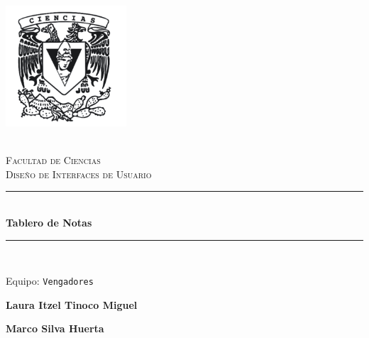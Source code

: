 \begin{titlepage}
    \center 
    \newcommand{\HRule}{\rule{\linewidth}{0.5mm}} 
    
    \includegraphics[width=4.5cm]{IMA/cienciasWhite.png}
    
    \quad \\[0.2cm]
    \textsc{\huge Facultad de Ciencias}\\[.6cm] 
    \textsc{\huge Diseño de Interfaces de Usuario}\\[0.5cm]
    
    \makeatletter
        \HRule \\ [0.4cm]
            { \huge \bfseries Tablero de Notas}\\
        \HRule \\ [0.4cm]
        
    \vspace{2mm}
    
    \begin{flushleft}
        \Large{Equipo:} \texttt{\Large Vengadores} \\[1.4cm]
    \end{flushleft}
    
    
    \vspace{5mm}
    
    \begin{minipage}{0.4\textwidth}
            \textbf{\Large{Laura Itzel Tinoco Miguel}}\\        
    \end{minipage}
    \begin{minipage}{0.4\textwidth}
        \begin{flushright}
            \textbf{\Large{Marco Silva Huerta}}\\        
        \end{flushright}
    \end{minipage}
    

\end{titlepage}
